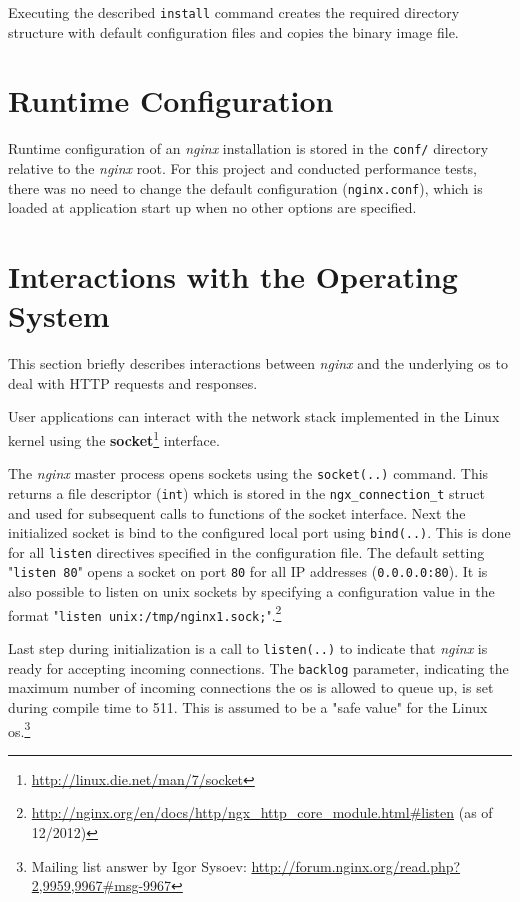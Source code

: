 Executing the described \texttt{install} command creates the required directory structure with default configuration files and copies the binary image file.
\\

\section{Runtime Configuration}

Runtime configuration of an \textit{nginx} installation is stored in the \texttt{conf/} directory relative to the \textit{nginx} root. For this project and conducted performance tests, there was no need to change the default configuration (\texttt{nginx.conf}), which is loaded at application start up when no other options are specified.
\\

\section{Interactions with the Operating System}
\label{sec:nginx-os-if}

This section briefly describes interactions between \textit{nginx} and the underlying \gls{os} to deal with HTTP requests and responses.

User applications can interact with the network stack implemented in the Linux kernel using the \textbf{socket}\footnote{\url{http://linux.die.net/man/7/socket}} interface.

The \textit{nginx} master process opens sockets using the \texttt{socket(..)} command. This returns a file descriptor (\texttt{int}) which is stored in the \texttt{ngx\_connection\_t} struct and used for subsequent calls to functions of the socket interface. Next the initialized socket is bind to the configured local port using \texttt{bind(..)}. This is done for all \texttt{listen} directives specified in the configuration file. The default setting "\texttt{listen 80}" opens a socket on port \texttt{80} for all IP addresses (\texttt{0.0.0.0:80}). It is also possible to listen on unix sockets by specifying a configuration value in the format "\texttt{listen unix:/tmp/nginx1.sock;}".\footnote{\url{http://nginx.org/en/docs/http/ngx\_http\_core\_module.html\#listen} (as of 12/2012)}

Last step during initialization is a call to \texttt{listen(..)} to indicate that \textit{nginx} is ready for accepting incoming connections. The \texttt{backlog} parameter, indicating the maximum number of incoming connections the \gls{os} is allowed to queue up, is set during compile time to 511. This is assumed to be a "safe value" for the Linux \gls{os}.\footnote{Mailing list answer by Igor Sysoev: \url{http://forum.nginx.org/read.php?2,9959,9967\#msg-9967}}

